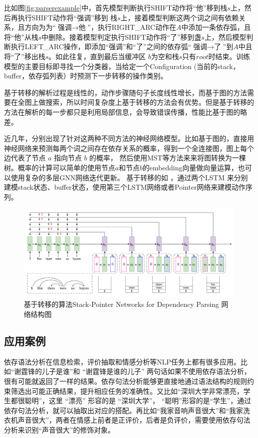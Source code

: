 比如图\ref{fig:parserexample}中，首先模型判断执行SHIFT动作将“他”移到栈$s$上，然后再执行SHIFT动作将“强调”移到 栈$s$上，接着模型判断这两个词之间有依赖关系，且方向为为“$\text{强调} \rightarrow \text{他}$”，执行RIGHT\_ARC动作在$A$中添加一条依存弧，且将“他”从栈$s$中删除。接着模型判定执行SHIFT动作将“了”移到盏$s$上，然后模型判断执行LEFT\_ARC操作，即添加“强调”和“了”之间的依存弧“$\text{强调} \rightarrow \text{了}$”到$A$中且将“了”移出栈$s$。如此往复，直到最后当缓冲区 $b$为空和栈$s$只有$root$时结束。训练模型的主要目标即寻找一个分类器，当给定一个Configuration (当前的stack，buffer，依存弧列表）时预测下一步转移的操作类别。

基于转移的解析过程是线性的，动作步骤随句子长度线性增长，而基于图的方法需要在全图上做搜索，所以时间复杂度上基于转移的方法会有优势。但是基于转移的方法在解析的每一步都只是利用局部信息，会导致错误传播，性能比基于图的略差。

近几年，分别出现了针对这两种不同方法的神经网络模型。比如基于图的\cite{dozat2016deep, ji2019graph, ma2017neural}，直接用神经网络来预测每两个词之间存在依存关系的概率，得到一个全连接图，图上每个边代表了节点 $a$ 指向节点 $b$ 的概率， 然后使用MST等方法来来将图转换为一棵树。概率的计算可以简单的使用节点$a$和节点$b$的embedding向量做向量运算，也可以使用复杂的多层GNN网络迭代更新。 基于转移的如 \cite{fernandez2019left, kiperwasser2016simple, ma2018stack}，通过两个LSTM 来分别建模stack状态、buffer状态，使用第三个LSTM网络或者Pointer网络来建模动作序列。 
\begin{figure}[h]
\centering
\includegraphics[scale=0.3]{img/chapter_nlp/parser_nn.png}
\caption{基于转移的算法Stack-Pointer Networks for Dependency Parsing 网络结构图}
\label{fig:parser_nn}
\end{figure}


\subsection{应用案例}
依存语法分析在信息检索，评价抽取和情感分析等NLP任务上都有很多应用。比如“谢霆锋的儿子是谁”和
“谢霆锋是谁的儿子” 两句话如果不使用依存语法分析，很有可能就返回了一样的结果。依存句法分析能够更直接地通过语法结构的规则约束筛选出可能正确结果，提升相应任务的准确性。又比如“深圳大学非常漂亮，学生都很聪明”，这里 “漂亮” 形容的是 “深圳大学”， “聪明”形容的是“学生”，通过依存句法分析，就可以抽取出对应的搭配。再比如“我家音响声音很大”和“我家洗衣机声音很大”，两者在情感上前者是正评价，后者是负评价，需要使用依存句法分析来识别“声音很大”的修饰对象。

